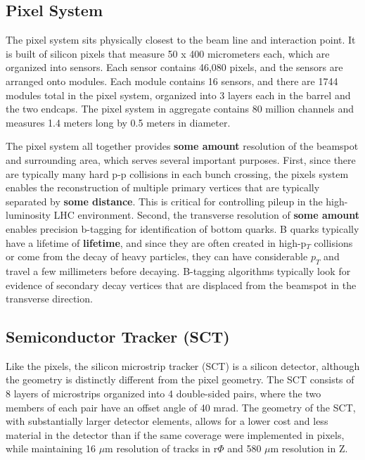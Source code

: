 \subsection{Pixel System}
The pixel system sits physically closest to the beam line and interaction point.  It is built of silicon pixels that measure 50 x 400 micrometers each, which are organized into sensors.  Each sensor contains 46,080 pixels, and the sensors are arranged onto modules.  Each module contains 16 sensors, and there are 1744 modules total in the pixel system, organized into 3 layers each in the barrel and the two endcaps.  The pixel system in aggregate contains 80 million channels and measures 1.4 meters long by 0.5 meters in diameter.

The pixel system all together provides \textbf{some amount} resolution of the beamspot and surrounding area, which serves several important purposes.  First, since there are typically many hard p-p collisions in each bunch crossing, the pixels system enables the reconstruction of multiple primary vertices that are typically separated by \textbf{some distance}.  This is critical for controlling pileup in the high-luminosity LHC environment.  Second, the transverse resolution of \textbf{some amount} enables precision b-tagging for identification of bottom quarks.  B quarks typically have a lifetime of \textbf{lifetime}, and since they are often created in high-p$_T$ collisions or come from the decay of heavy particles, they can have considerable $p_T$ and travel a few millimeters before decaying.  B-tagging algorithms typically look for evidence of secondary decay vertices that are displaced from the beamspot in the transverse direction.   

\subsection{Semiconductor Tracker (SCT)}
Like the pixels, the silicon microstrip tracker (SCT) is a silicon detector, although the geometry is distinctly different from the pixel geometry.  The SCT consists of 8 layers of microstrips organized into 4 double-sided pairs, where the two members of each pair have an offset angle of 40 mrad.  The geometry of the SCT, with substantially larger detector elements, allows for a lower cost and less material in the detector than if the same coverage were implemented in pixels, while maintaining 16 $\mu$m resolution of tracks in r$\Phi$ and 580 $\mu$m resolution in Z.   



